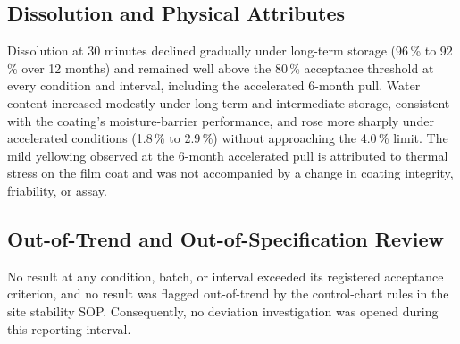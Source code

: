 \subsection{Dissolution and Physical Attributes}
Dissolution at 30 minutes declined gradually under long-term storage (96\,\% to
92\,\% over 12 months) and remained well above the 80\,\% acceptance threshold at every
condition and interval, including the accelerated 6-month pull. Water content increased
modestly under long-term and intermediate storage, consistent with the coating's
moisture-barrier performance, and rose more sharply under accelerated conditions
(1.8\,\% to 2.9\,\%) without approaching the 4.0\,\% limit. The mild yellowing observed
at the 6-month accelerated pull is attributed to thermal stress on the film coat and was
not accompanied by a change in coating integrity, friability, or assay.

\subsection{Out-of-Trend and Out-of-Specification Review}
No result at any condition, batch, or interval exceeded its registered acceptance
criterion, and no result was flagged out-of-trend by the control-chart rules in the
site stability SOP. Consequently, no deviation investigation was opened during this
reporting interval.
